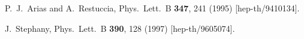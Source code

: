 \documentclass[a4paper,12pt]{article}
\begin{document}
\begin{thebibliography}{25}
 P.~J.~Arias and A.~Restuccia,
Phys.\ Lett.\ B {\bf 347}, 241 (1995)
[hep-th/9410134].

 J.~Stephany,
Phys.\ Lett.\ B {\bf 390}, 128 (1997)
[hep-th/9605074].































\end{thebibliography}
\end{document}
